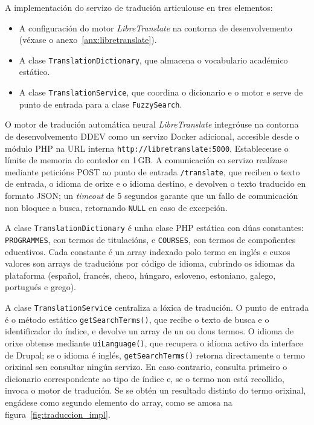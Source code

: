 \documentclass[%
    a4paper,               %
    twoside,               %
    10pt,                  %
]{article}                 %
\begin{document}
A implementación do servizo de tradución articulouse en tres elementos:
\begin{itemize}
    \item A configuración do motor \textit{LibreTranslate} \cite{libretranslate} na contorna de desenvolvemento (véxase o anexo~\ref{anx:libretranslate}).
    \item A clase \texttt{TranslationDictionary}, que almacena o vocabulario académico estático.
    \item A clase \texttt{TranslationService}, que coordina o dicionario e o motor e serve de punto de entrada para a clase \texttt{FuzzySearch}.
\end{itemize}

O motor de tradución automática neural \textit{LibreTranslate} integróuse na contorna de desenvolvemento DDEV como un servizo Docker adicional, accesible desde o módulo PHP na URL interna \texttt{http://libretranslate:5000}. Estableceuse o límite de memoria do contedor en 1\,GB. A comunicación co servizo realízase mediante peticións POST ao punto de entrada \texttt{/translate}, que reciben o texto de entrada, o idioma de orixe e o idioma destino, e devolven o texto traducido en formato JSON; un \textit{timeout} de 5 segundos garante que un fallo de comunicación non bloquee a busca, retornando \texttt{NULL} en caso de excepción.

A clase \texttt{TranslationDictionary} é unha clase PHP estática con dúas constantes: \texttt{PROGRAMMES}, con termos de titulacións, e \texttt{COURSES}, con termos de compoñentes educativos. Cada constante é un array indexado polo termo en inglés e cuxos valores son arrays de traducións por código de idioma, cubrindo os idiomas da plataforma (español, francés, checo, húngaro, esloveno, estoniano, galego, portugués e grego).

A clase \texttt{TranslationService} centraliza a lóxica de tradución. O punto de entrada é o método estático \texttt{getSearchTerms()}, que recibe o texto de busca e o identificador do índice, e devolve un array de un ou dous termos. O idioma de orixe obtense mediante \texttt{uiLanguage()}, que recupera o idioma activo da interface de Drupal; se o idioma é inglés, \texttt{getSearchTerms()} retorna directamente o termo orixinal sen consultar ningún servizo. En caso contrario, consulta primeiro o dicionario correspondente ao tipo de índice e, se o termo non está recollido, invoca o motor de tradución. Se se obtén un resultado distinto do termo orixinal, engádese como segundo elemento do array, como se amosa na figura~\ref{fig:traduccion_impl}.
\end{document}
